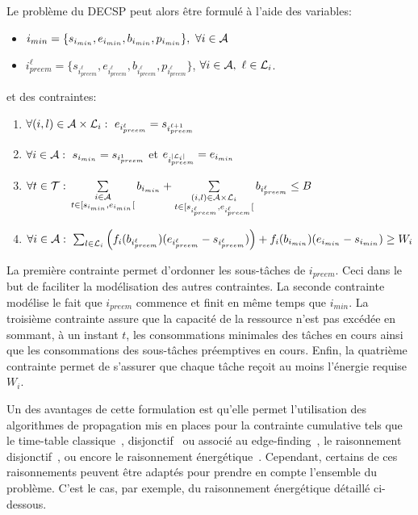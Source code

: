 Le problème du DECSP peut alors être formulé à l'aide des variables:
\begin{itemize}
\item $i_{min}=\{s_{i_{min}}, e_{i_{min}}, b_{i_{min}},p_{i_{min}}\},\ 
  \forall i \in {\cal A}$ 
\item $i_{preem}^\ell=\{s_{i_{preem}^\ell},e_{i_{preem}^\ell},
  b_{i_{preem}^\ell},p_{i_{preem}^\ell}\}$, $\forall i \in {\cal A},\
  \ell \in {\cal L}_i$.
\end{itemize}
et des contraintes:
\begin{enumerate}  
\item $\forall (i,l) \in {\cal A} \times {\cal L}_i:\
  e_{i_{preem}^\ell} = s_{i_{preem}^{\ell+1}}$ 
\vspace{0.2cm}
\item $\forall i \in {\cal A}:\  s_{i_{min}} = s_{i_{preem}^1}$ et $ e_{i_{preem}^{|{\cal L}_i|}} = e_{i_{min}}$   
\vspace{0.2cm}
\item $\forall t \in  {\cal T}:\\ \sum\limits_{\substack{i \in {\cal A} \\ t \in [s_{i_{min}},e_{i_{min}}[}} b_{i_{min}}
  + \sum\limits_{\substack{(i,l) \in {\cal A}\times {\cal L}_i\\ t \in
      [s_{i_{preem}^\ell},e_{i_{preem}^\ell}[}}
  b_{i_{preem}^\ell} \le B$ 
\vspace{0.2cm}
\item $\forall i \in {\cal A}:\ \sum_{l \in {\cal L}_i} \left(f_i(b_{i_{preem}^\ell})
    (e_{i_{preem}^\ell}-s_{i_{preem}^\ell})\right) +
  f_i(b_{i_{min}}) (e_{i_{min}}-s_{i_{min}}) \ge W_i $
\end{enumerate}
La première contrainte permet d'ordonner les sous-tâches de
$i_{preem}$. Ceci dans le but de faciliter la modélisation des autres
contraintes. La seconde contrainte modélise le fait que $i_{preem}$
commence et finit en même temps que $i_{min}$. La troisième contrainte
assure que la capacité de la ressource n'est pas excédée en sommant, à
un instant $t$, les consommations minimales des tâches en cours ainsi
que les consommations des sous-tâches préemptives en cours. Enfin, la
quatrième contrainte permet de s'assurer que chaque tâche reçoit au
moins l'énergie requise $W_i$. 

Un des avantages de cette formulation est qu'elle permet l'utilisation
des algorithmes de propagation mis en places pour la contrainte
cumulative tels que le time-table classique~\cite{Baptiste2001},
disjonctif~\cite{Gay2015} ou associé au edge-finding~\cite{Vilim2011},
le raisonnement disjonctif~\cite{Baptiste2001}, ou encore le
raisonnement énergétique~\cite{Lopez1990}. Cependant, certains de ces
raisonnements peuvent être adaptés pour 
prendre en compte l'ensemble du problème. C'est le cas, par exemple,
du raisonnement énergétique détaillé ci-dessous.

